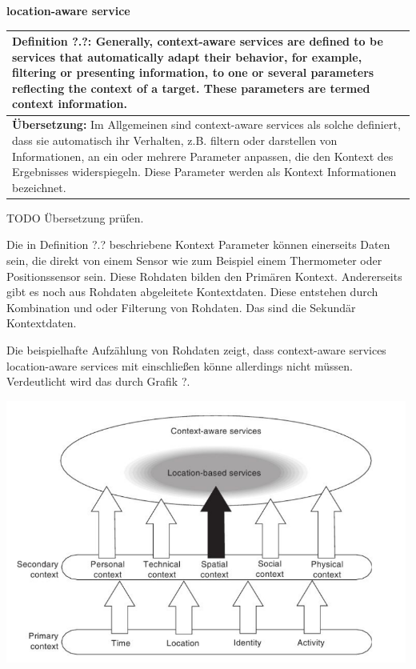 \textbf{location-aware service} \\
\begin{table}[h]
	\centering
	\begin{tabular}{|p{16cm}|}\hline
		\textbf{Definition ?.?:} \glqq Generally, context-aware services are defined to be services that automatically adapt their behavior, for example, filtering or presenting information, to one or several parameters reflecting the context of a target. These parameters are termed context information.\grqq \cite[S.2]{Kuepper2005}\\ \hline
		\textbf{Übersetzung:} Im Allgemeinen sind context-aware services als solche definiert, dass sie automatisch ihr Verhalten, z.B. filtern oder darstellen von Informationen, an ein oder mehrere Parameter anpassen, die den Kontext des Ergebnisses widerspiegeln. Diese Parameter werden als Kontext Informationen bezeichnet. \\ \hline
	\end{tabular}
\end{table}

TODO Übersetzung prüfen.

Die in Definition ?.? beschriebene Kontext Parameter können einerseits Daten sein, die direkt von einem Sensor wie zum Beispiel einem Thermometer oder Positionssensor sein. Diese Rohdaten bilden den Primären Kontext. Andererseits gibt es noch aus Rohdaten abgeleitete Kontextdaten. Diese entstehen durch Kombination und oder Filterung von Rohdaten. Das sind die Sekundär Kontextdaten.

Die beispielhafte Aufzählung von Rohdaten zeigt, dass context-aware services location-aware services mit einschließen könne allerdings nicht müssen. Verdeutlicht wird das durch Grafik ?.

\includegraphics[width=0.99\textwidth]{ref/images/definitionK.png} \cite{Kuepper2005}


